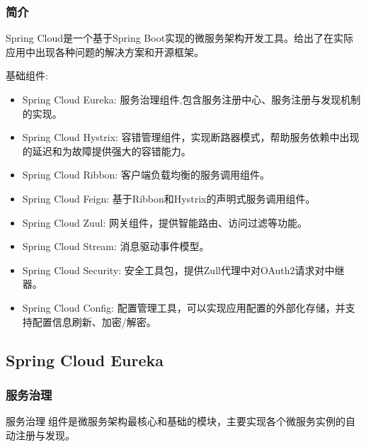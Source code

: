 \documentclass[letterpaper,10pt,english]{sphinxmanual}
\begin{document}
\subsubsection{简介}
\label{\detokenize{01.spring-cloud/01.introduction/introduction_01:id1}}\label{\detokenize{01.spring-cloud/01.introduction/introduction_01::doc}}
Spring Cloud是一个基于Spring Boot实现的微服务架构开发工具。给出了在实际应用中出现各种问题的解决方案和开源框架。

\noindent{}

基础组件:
\begin{itemize}
\item {} 
Spring Cloud Eureka: 服务治理组件,包含服务注册中心、服务注册与发现机制的实现。

\item {} 
Spring Cloud Hystrix: 容错管理组件，实现断路器模式，帮助服务依赖中出现的延迟和为故障提供强大的容错能力。

\item {} 
Spring Cloud Ribbon: 客户端负载均衡的服务调用组件。

\item {} 
Spring Cloud Feign: 基于Ribbon和Hystrix的声明式服务调用组件。

\item {} 
Spring Cloud Zuul: 网关组件，提供智能路由、访问过滤等功能。

\item {} 
Spring Cloud Stream: 消息驱动事件模型。

\item {} 
Spring Cloud Security: 安全工具包，提供Zull代理中对OAuth2请求对中继器。

\item {} 
Spring Cloud Config: 配置管理工具，可以实现应用配置的外部化存储，并支持配置信息刷新、加密/解密。

\end{itemize}


\subsection{Spring Cloud Eureka}
\label{\detokenize{01.spring-cloud/02.eureka/eureka:spring-cloud-eureka}}\label{\detokenize{01.spring-cloud/02.eureka/eureka::doc}}

\subsubsection{服务治理}
\label{\detokenize{01.spring-cloud/02.eureka/eureka_01:id1}}\label{\detokenize{01.spring-cloud/02.eureka/eureka_01::doc}}
服务治理组件是微服务架构最核心和基础的模块，主要实现各个微服务实例的自动注册与发现。
\end{document}

